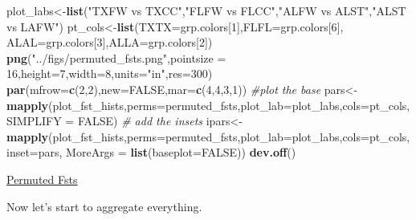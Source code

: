 \documentclass[]{article}
\newenvironment{Shaded}{\begin{snugshade}}{\end{snugshade}}
\newcommand{\KeywordTok}[1]{\textcolor[rgb]{0.13,0.29,0.53}{\textbf{#1}}}
\newcommand{\DataTypeTok}[1]{\textcolor[rgb]{0.13,0.29,0.53}{#1}}
\newcommand{\DecValTok}[1]{\textcolor[rgb]{0.00,0.00,0.81}{#1}}
\newcommand{\StringTok}[1]{\textcolor[rgb]{0.31,0.60,0.02}{#1}}
\newcommand{\CommentTok}[1]{\textcolor[rgb]{0.56,0.35,0.01}{\textit{#1}}}
\newcommand{\OtherTok}[1]{\textcolor[rgb]{0.56,0.35,0.01}{#1}}
\newcommand{\NormalTok}[1]{#1}
\begin{document}
\begin{Shaded}
\begin{Highlighting}[]
\NormalTok{plot_labs<-}\KeywordTok{list}\NormalTok{(}\StringTok{"TXFW vs TXCC"}\NormalTok{,}\StringTok{"FLFW vs FLCC"}\NormalTok{,}\StringTok{"ALFW vs ALST"}\NormalTok{,}\StringTok{"ALST vs LAFW"}\NormalTok{)}
\NormalTok{pt_cols<-}\KeywordTok{list}\NormalTok{(}\DataTypeTok{TXTX=}\NormalTok{grp.colors[}\DecValTok{1}\NormalTok{],}\DataTypeTok{FLFL=}\NormalTok{grp.colors[}\DecValTok{6}\NormalTok{],}
              \DataTypeTok{ALAL=}\NormalTok{grp.colors[}\DecValTok{3}\NormalTok{],}\DataTypeTok{ALLA=}\NormalTok{grp.colors[}\DecValTok{2}\NormalTok{])}
\KeywordTok{png}\NormalTok{(}\StringTok{"../figs/permuted_fsts.png"}\NormalTok{,}\DataTypeTok{pointsize =} \DecValTok{16}\NormalTok{,}\DataTypeTok{height=}\DecValTok{7}\NormalTok{,}\DataTypeTok{width=}\DecValTok{8}\NormalTok{,}\DataTypeTok{units=}\StringTok{"in"}\NormalTok{,}\DataTypeTok{res=}\DecValTok{300}\NormalTok{)}
\KeywordTok{par}\NormalTok{(}\DataTypeTok{mfrow=}\KeywordTok{c}\NormalTok{(}\DecValTok{2}\NormalTok{,}\DecValTok{2}\NormalTok{),}\DataTypeTok{new=}\OtherTok{FALSE}\NormalTok{,}\DataTypeTok{mar=}\KeywordTok{c}\NormalTok{(}\DecValTok{4}\NormalTok{,}\DecValTok{4}\NormalTok{,}\DecValTok{3}\NormalTok{,}\DecValTok{1}\NormalTok{))}
\CommentTok{#plot the base}
\NormalTok{pars<-}\KeywordTok{mapply}\NormalTok{(plot_fst_hists,}\DataTypeTok{perms=}\NormalTok{permuted_fsts,}\DataTypeTok{plot_lab=}\NormalTok{plot_labs,}\DataTypeTok{cols=}\NormalTok{pt_cols,}\DataTypeTok{SIMPLIFY =} \OtherTok{FALSE}\NormalTok{)}
\CommentTok{# add the insets}
\NormalTok{ipars<-}\KeywordTok{mapply}\NormalTok{(plot_fst_hists,}\DataTypeTok{perms=}\NormalTok{permuted_fsts,}\DataTypeTok{plot_lab=}\NormalTok{plot_labs,}\DataTypeTok{cols=}\NormalTok{pt_cols,}
              \DataTypeTok{inset=}\NormalTok{pars,}
              \DataTypeTok{MoreArgs =} \KeywordTok{list}\NormalTok{(}\DataTypeTok{baseplot=}\OtherTok{FALSE}\NormalTok{))}
\KeywordTok{dev.off}\NormalTok{()}
\end{Highlighting}
\end{Shaded}

\href{../figs/permuted_fsts.png}{Permuted Fsts}

Now let's start to aggregate everything.
\end{document}
